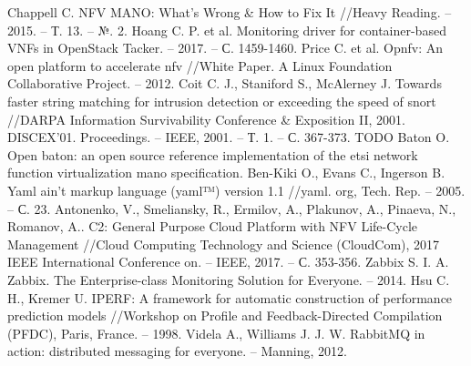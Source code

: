 \documentclass[oneside,final,14pt,a4paper]{extreport}
\begin{document}
\begin{thebibliography}{00}
 Chappell C. NFV MANO: What's Wrong \& How to Fix It //Heavy Reading. – 2015. – Т. 13. – №. 2.
 Hoang C. P. et al. Monitoring driver for container-based VNFs in OpenStack Tacker. – 2017. – С. 1459-1460.
 Price C. et al. Opnfv: An open platform to accelerate nfv //White Paper. A Linux Foundation Collaborative Project. – 2012.
 Coit C. J., Staniford S., McAlerney J. Towards faster string matching for intrusion detection or exceeding the speed of snort //DARPA Information Survivability Conference \& Exposition II, 2001. DISCEX'01. Proceedings. – IEEE, 2001. – Т. 1. – С. 367-373.
 TODO
 Baton O. Open baton: an open source reference implementation of the etsi network function virtualization mano specification.
 Ben-Kiki O., Evans C., Ingerson B. Yaml ain't markup language (yaml™) version 1.1 //yaml. org, Tech. Rep. – 2005. – С. 23.
 Antonenko, V., Smeliansky, R., Ermilov, A., Plakunov, A., Pinaeva, N., Romanov, A.. C2: General Purpose Cloud Platform with NFV Life-Cycle Management //Cloud Computing Technology and Science (CloudCom), 2017 IEEE International Conference on. – IEEE, 2017. – С. 353-356.
 Zabbix S. I. A. Zabbix. The Enterprise-class Monitoring Solution for Everyone. – 2014.
 Hsu C. H., Kremer U. IPERF: A framework for automatic construction of performance prediction models //Workshop on Profile and Feedback-Directed Compilation (PFDC), Paris, France. – 1998.
 Videla A., Williams J. J. W. RabbitMQ in action: distributed messaging for everyone. – Manning, 2012.
\end{thebibliography}

\end{document}
